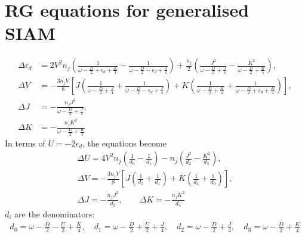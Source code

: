 \section{RG equations for generalised SIAM}
\begin{equation}\begin{aligned}
	\Delta \epsilon_d &= 2V^2 n_j\left(\frac{1}{\omega - \frac{D}{2} + \epsilon_d + \frac{K}{4}} - \frac{1}{\omega - \frac{D}{2} - \epsilon_d + \frac{J}{4}}\right) + \frac{n_j}{2}\left(\frac{J^2}{\omega - \frac{D}{2} + \frac{J}{4}} - \frac{K^2}{\omega - \frac{D}{2} + \frac{K}{4}}\right),\\
	\Delta V &= -\frac{3n_j V}{8}\left[J\left(\frac{1}{\omega - \frac{D}{2} + \frac{J}{4}} + \frac{1}{\omega - \frac{D}{2} - \epsilon_d + \frac{J}{4}}\right) + K \left(\frac{1}{\omega - \frac{D}{2} + \frac{K}{4}} + \frac{1}{\omega - \frac{D}{2} + \epsilon_d + \frac{K}{4}}\right)\right],\\
	\Delta J &= -\frac{n_j J^2}{\omega - \frac{D}{2} + \frac{J}{4}},\\ 
	\Delta K &= -\frac{n_j K^2}{\omega - \frac{D}{2} + \frac{K}{4}}
\end{aligned}\end{equation}
In terms of \(U = -2\epsilon_d\), the equations become
\begin{gather}
	\Delta U = 4V^2 n_j\left(\frac{1}{d_0} - \frac{1}{d_1}\right) - n_j\left(\frac{J^2}{d_2} - \frac{K^2}{d_3}\right),\\
	\Delta V = -\frac{3n_j V}{8}\left[J\left(\frac{1}{d_2} + \frac{1}{d_1}\right) + K \left(\frac{1}{d_3} + \frac{1}{d_0}\right)\right],\\
	\Delta J = -\frac{n_j J^2}{d_2}, \quad\quad\Delta K = -\frac{n_j K^2}{d_3}
\end{gather}
\(d_i\) are the denominators:
\begin{equation}\begin{aligned}
	d_0 = \omega - \frac{D}{2} - \frac{U}{2} + \frac{K}{4}, \quad d_1 = \omega - \frac{D}{2} + \frac{U}{2} + \frac{J}{4}, \quad d_2 = \omega - \frac{D}{2} + \frac{J}{4}, \quad d_3 = \omega - \frac{D}{2} + \frac{K}{4}
\end{aligned}\end{equation}

